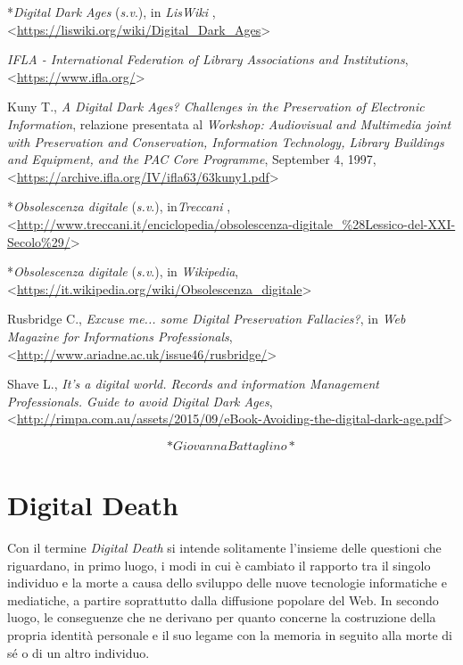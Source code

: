 \documentclass[
  b5paper,
  twoside,
  11pt,
  chapterprefix=false,
  bibliography=totocnumbered,
  listof=flat]{scrbook}
\begin{document}
*\emph{Digital Dark Ages} (\emph{s.v}.), in \emph{LisWiki} ,
\textless{}\href{https://liswiki.org/wiki/Digital_Dark_Ages}{{https://liswiki.org/wiki/Digital\_Dark\_Ages}}\textgreater{}

\emph{IFLA - International Federation of Library Associations and
Institutions},
\textless{}\href{https://www.ifla.org/}{{https://www.ifla.org/}}\textgreater{}

Kuny T., \emph{A Digital Dark Ages? Challenges in the Preservation of
Electronic Information}, relazione presentata al \emph{Workshop: Audiovisual
and Multimedia joint with Preservation and Conservation, Information
Technology, Library Buildings and Equipment, and the PAC Core
Programme}, September 4, 1997,
\textless{}\href{https://archive.ifla.org/IV/ifla63/63kuny1.pdf}{{https://archive.ifla.org/IV/ifla63/63kuny1.pdf}}\textgreater{}

*\emph{Obsolescenza digitale} (\emph{s.v}.), in\emph{Treccani} ,
\textless{}\href{http://www.treccani.it/enciclopedia/obsolescenza-digitale_(Lessico-del-XXI-Secolo)/}{{http://www.treccani.it/enciclopedia/obsolescenza-digitale\_\%28Lessico-del-XXI-Secolo\%29/}}\textgreater{}

*\emph{Obsolescenza digitale} (\emph{s.v}.), in \emph{Wikipedia},
\textless{}\href{https://it.wikipedia.org/wiki/Obsolescenza_digitale}{{https://it.wikipedia.org/wiki/Obsolescenza\_digitale}}\textgreater{}

Rusbridge C., \emph{Excuse me... some Digital Preservation Fallacies?}, in
\emph{Web Magazine for Informations Professionals},
\textless{}\href{http://www.ariadne.ac.uk/issue46/rusbridge/}{{http://www.ariadne.ac.uk/issue46/rusbridge/}}\textgreater{}

Shave L., \emph{It's a digital world. Records and information Management
Professionals. Guide to avoid Digital Dark Ages},
\textless{}\href{http://rimpa.com.au/assets/2015/09/eBook-Avoiding-the-digital-dark-age.pdf}{{http://rimpa.com.au/assets/2015/09/eBook-Avoiding-the-digital-dark-age.pdf}}\textgreater{}

\[*Giovanna Battaglino*\]

\hypertarget{digital-death}{%
\chapter{Digital Death}\label{digital-death}}

Con il termine \emph{Digital Death} si intende solitamente l'insieme delle
questioni che riguardano, in primo luogo, i modi in cui è cambiato il
rapporto tra il singolo individuo e la morte a causa dello sviluppo
delle nuove tecnologie informatiche e mediatiche, a partire soprattutto
dalla diffusione popolare del Web. In secondo luogo, le conseguenze che
ne derivano per quanto concerne la costruzione della propria identità
personale e il suo legame con la memoria in seguito alla morte di sé o
di un altro individuo.
\end{document}

